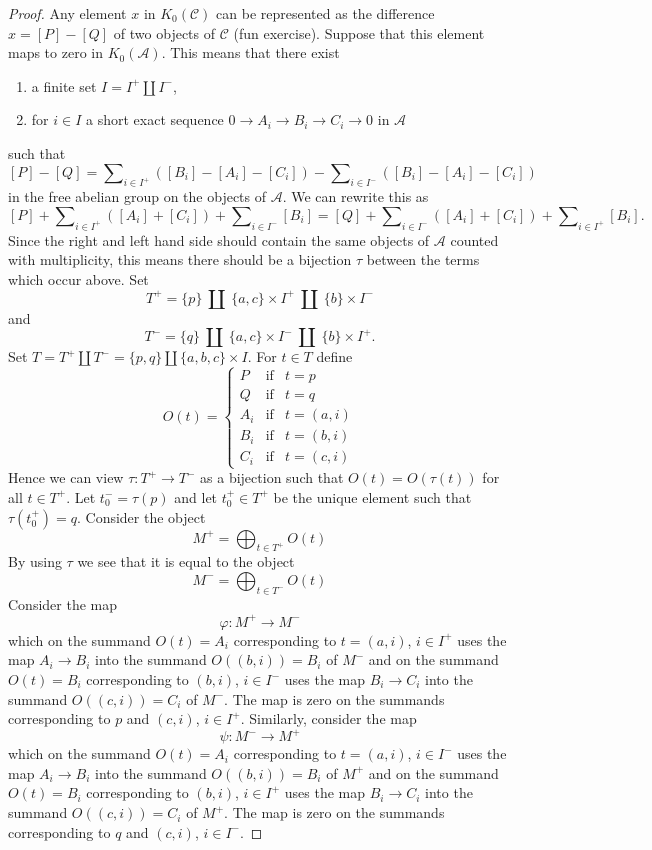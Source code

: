 \begin{proof}
\medskip\noindent
Any element $x$ in $K_0(\mathcal{C})$ can be represented as the
difference $x = [P] - [Q]$ of two objects of $\mathcal{C}$ (fun exercise).
Suppose that this element maps to zero in $K_0(\mathcal{A})$.
This means that there exist
\begin{enumerate}
\item a finite set $I = I^{+} \amalg I^{-}$,
\item for $i \in I$ a short exact sequence $0 \to A_i \to B_i \to C_i \to 0$
in $\mathcal{A}$
\end{enumerate}
such that
$$
[P] - [Q] =
\sum\nolimits_{i \in I^{+}} ([B_i] - [A_i] - [C_i])
-
\sum\nolimits_{i \in I^{-}} ([B_i] - [A_i] - [C_i])
$$
in the free abelian group on the objects of $\mathcal{A}$.
We can rewrite this as
$$
[P]
+ \sum\nolimits_{i \in I^{+}} ([A_i] + [C_i])
+ \sum\nolimits_{i \in I^{-}} [B_i]
=
[Q]
+ \sum\nolimits_{i \in I^{-}} ([A_i] + [C_i])
+ \sum\nolimits_{i \in I^{+}} [B_i].
$$
Since the right and left hand side should contain the same objects
of $\mathcal{A}$ counted with multiplicity, this means there should be
a bijection $\tau$ between the terms which occur above. Set
$$
T^{+} =
\{p\}\ \amalg\ \{a, c\} \times I^{+}\ \amalg\ \{b\} \times I^{-}
$$
and
$$
T^{-} =
\{q\}\ \amalg\ \{a, c\} \times I^{-}\ \amalg\ \{b\} \times I^{+}.
$$
Set $T = T^{+} \amalg T^{-} = \{p, q\} \amalg \{a, b, c\} \times I$.
For $t \in T$ define
$$
O(t)
=
\left\{
\begin{matrix}
P & \text{if} & t = p \\
Q & \text{if} & t = q \\
A_i & \text{if} & t = (a, i) \\
B_i & \text{if} & t = (b, i) \\
C_i & \text{if} & t = (c, i)
\end{matrix}
\right.
$$
Hence we can view $\tau : T^{+} \to T^{-}$ as a bijection
such that $O(t) = O(\tau(t))$ for all $t \in T^{+}$.
Let $t^{-}_0 = \tau(p)$ and let $t^{+}_0 \in T^{+}$ be the
unique element such that $\tau(t^{+}_0) = q$.
Consider the object
$$
M^{+} = \bigoplus\nolimits_{t \in T^{+}} O(t)
$$
By using $\tau$ we see that it is equal to the object
$$
M^{-} = \bigoplus\nolimits_{t \in T^{-}} O(t)
$$
Consider the map
$$
\varphi : M^{+} \longrightarrow M^{-}
$$
which on the summand $O(t) = A_i$ corresponding to $t = (a, i)$, $i \in I^{+}$
uses the map $A_i \to B_i$ into the summand $O((b, i)) = B_i$ of $M^{-}$
and on the summand $O(t) = B_i$ corresponding to $(b, i)$, $i \in I^{-}$
uses the map $B_i \to C_i$ into the summand $O((c, i)) = C_i$ of $M^{-}$.
The map is zero on the summands corresponding to $p$
and $(c, i)$, $i \in I^{+}$.
Similarly, consider the map
$$
\psi : M^{-} \longrightarrow M^{+}
$$
which on the summand $O(t) = A_i$ corresponding to $t = (a, i)$, $i \in I^{-}$
uses the map $A_i \to B_i$ into the summand $O((b, i)) = B_i$ of $M^{+}$
and on the summand $O(t) = B_i$ corresponding to $(b, i)$, $i \in I^{+}$
uses the map $B_i \to C_i$ into the summand $O((c, i)) = C_i$ of $M^{+}$.
The map is zero on the summands corresponding to $q$ and
$(c, i)$, $i \in I^{-}$.


\end{proof}
